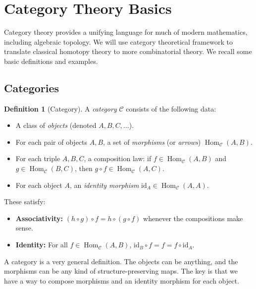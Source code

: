 \documentclass[11pt]{article}
\theoremstyle{definition}
\newtheorem{definition}{Definition}[section]
\theoremstyle{plain}
\begin{document}
\section{Category Theory Basics}

Category theory provides a unifying language for much of modern mathematics, including algebraic topology.
We will use category theoretical framework to translate classical homotopy theory to more combinatorial theory.
We recall some basic definitions and examples.

\subsection{Categories}

\begin{definition}[Category]
    A \emph{category} $\mathcal{C}$ consists of the following data:
    \begin{itemize}
        \item A class of \emph{objects} (denoted $A, B, C, \dots$).
        \item For each pair of objects $A, B$, a set of \emph{morphisms} (or \emph{arrows}) $\operatorname{Hom}_{\mathcal{C}}(A, B)$.
        \item For each triple $A, B, C$, a composition law: if $f \in \operatorname{Hom}_{\mathcal{C}}(A, B)$ and $g \in \operatorname{Hom}_{\mathcal{C}}(B, C)$, then $g \circ f \in \operatorname{Hom}_{\mathcal{C}}(A, C)$.
        \item For each object $A$, an \emph{identity morphism} $\mathrm{id}_A \in \operatorname{Hom}_{\mathcal{C}}(A, A)$.
    \end{itemize}
    These satisfy:
    \begin{itemize}
        \item \textbf{Associativity:} $(h \circ g) \circ f = h \circ (g \circ f)$ whenever the compositions make sense.
        \item \textbf{Identity:} For all $f \in \operatorname{Hom}_{\mathcal{C}}(A, B)$, $\mathrm{id}_B \circ f = f = f \circ \mathrm{id}_A$.
    \end{itemize}
\end{definition}


A category is a very general definition. The objects can be anything, and the morphisms can be any kind of structure-preserving maps. The key is that we have a way to compose morphisms and an identity morphism for each object.
\end{document}
